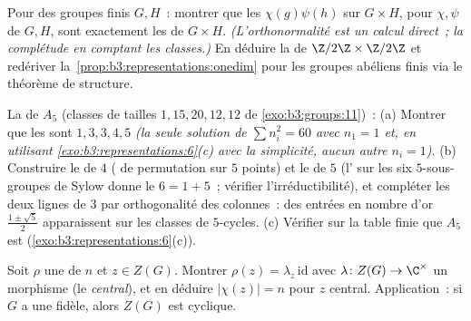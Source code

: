 \begin{exercise}[$\star\star\star$]\label{exo:b3:representations:8}
Pour des groupes finis $G, H$~: montrer que les  $\chi(g)\psi(h)$ sur $G \times H$, pour $\chi, \psi$
  de $G, H$, sont exactement les
  de $G \times H$.
\emph{(L'orthonormalité est un calcul direct~; la complétude
en comptant les classes.)} En déduire la  de
$\Z/2\Z \times \Z/2\Z$ et redériver
la~\cref{prop:b3:representations:onedim} pour les groupes
abéliens finis via le théorème de structure.
\end{exercise}

\begin{exercise}[$\star\star\star$]\label{exo:b3:representations:9}
La  de $A_5$ (classes de tailles $1, 15, 20,
12, 12$ de \cref{exo:b3:groups:11})~:
(a) Montrer que les  sont $1, 3, 3, 4, 5$ \emph{(la seule
solution de $\sum n_i^2 = 60$ avec $n_1 = 1$ et, en utilisant
\cref{exo:b3:representations:6}(c) avec la simplicité, aucun
autre $n_i = 1$)}.
(b) Construire le  de  $4$ ( de permutation
sur $5$ points) et le  de  $5$ (l' sur les
six $5$-sous-groupes de Sylow donne le  $6 = 1 + 5$~;
vérifier l'irréductibilité), et compléter les deux lignes de
 $3$ par orthogonalité des colonnes~: des entrées en
nombre d'or $\frac{1\pm\sqrt5}2$ apparaissent sur les classes
de $5$-cycles.
(c) Vérifier sur la table finie que $A_5$ est 
(\cref{exo:b3:representations:6}(c)).
\end{exercise}

\begin{exercise}[$\star\star$]\label{exo:b3:representations:10}
Soit $\rho$ une  de  $n$ et $z
\in Z(G)$. Montrer $\rho(z) = \lambda_z\,\mathrm{id}$ avec
$\lambda \colon Z(G) \to \C^\times$ un morphisme (le
\emph{ central}), et en déduire $|\chi(z)| = n$ pour
$z$ central. Application~: si $G$ a une  fidèle, alors $Z(G)$ est cyclique.
\end{exercise}

